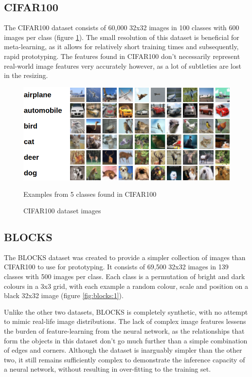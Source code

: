 \documentclass{report}
\begin{document}
\subsection{CIFAR100}
The CIFAR100\parencite{cifar100} dataset consists of 60,000 32x32 images in 100 classes with 600 images per class (figure \ref{fig:cifarexamples:1}). The small resolution of this dataset is beneficial for meta-learning, as it allows for relatively short training times and subsequently, rapid prototyping. The features found in CIFAR100 don't necessarily represent real-world image features very accurately however, as a lot of subtleties are lost in the resizing.
\begin{figure}[h!]
	\centering
	\includegraphics[width=12cm]{cifarexamples}
	\caption{CIFAR100 dataset images}
	Examples from 5 classes found in CIFAR100
	\label{fig:cifarexamples:1}
\end{figure}

\subsection{BLOCKS}
The BLOCKS dataset was created to provide a simpler collection of images than CIFAR100 to use for prototyping. It consists of 69,500 32x32 images in 139 classes with 500 images per class. Each class is a permutation of bright and dark colours in a 3x3 grid, with each example a random colour, scale and position on a black 32x32 image (figure \ref{fig:blocks:1}). \par
Unlike the other two datasets, BLOCKS is completely synthetic, with no attempt to mimic real-life image distributions. The lack of complex image features lessens the burden of feature-learning from the neural network, as the relationships that form the objects in this dataset don't go much further than a simple combination of edges and corners. Although the dataset is inarguably simpler than the other two, it still remains sufficiently complex to demonstrate the inference capacity of a neural network, without resulting in over-fitting to the training set.
\end{document}
